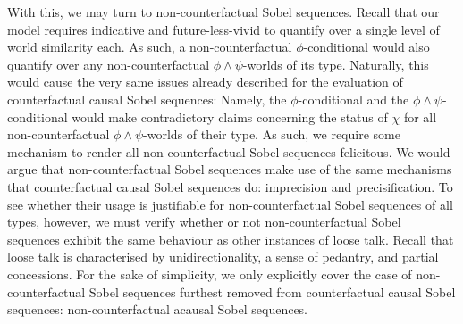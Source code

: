With this, we may turn to non-counterfactual Sobel sequences. Recall that our model requires indicative and future-less-vivid to quantify over a single level of world similarity each. As such, a non-counterfactual $\phi$-conditional would also quantify over any non-counterfactual $\phi\land\psi$-worlds of its type. Naturally, this would cause the very same issues already described for the evaluation of counterfactual causal Sobel sequences: Namely, the $\phi$-conditional and the $\phi\land\psi$-conditional would make contradictory claims concerning the status of $\chi$ for all non-counterfactual $\phi\land\psi$-worlds of their type. As such, we require some mechanism to render all non-counterfactual Sobel sequences felicitous. We would argue that non-counterfactual Sobel sequences make use of the same mechanisms that counterfactual causal Sobel sequences do: imprecision and precisification. To see whether their usage is justifiable for non-counterfactual Sobel sequences of all types, however, we must verify whether or not non-counterfactual Sobel sequences exhibit the same behaviour as other instances of loose talk. Recall that loose talk is characterised by unidirectionality, a sense of pedantry, and partial concessions. For the sake of simplicity, we only explicitly cover the case of non-counterfactual Sobel sequences furthest removed from counterfactual causal Sobel sequences: non-counterfactual acausal Sobel sequences.

